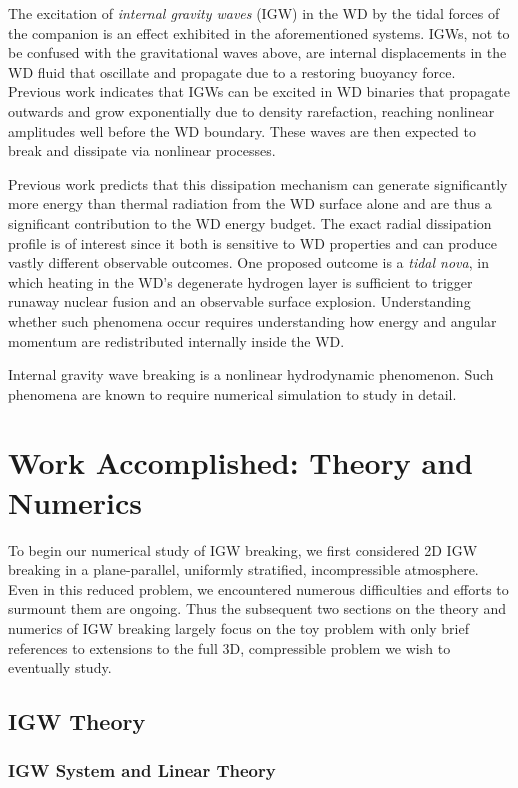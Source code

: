 \documentclass[11pt,
        usenames, %
        dvipsnames %
    ]{article}
\begin{document}
The excitation of \emph{internal gravity waves} (IGW) in the WD by the tidal
forces of the companion is an effect exhibited in the aforementioned systems.
IGWs, not to be confused with the gravitational waves above, are internal
displacements in the WD fluid that oscillate and propagate due to a restoring
buoyancy force. Previous work\citep{fullerI} indicates that IGWs can be excited
in WD binaries that propagate outwards and grow exponentially due to density
rarefaction, reaching nonlinear amplitudes well before the WD boundary. These
waves are then expected to break and dissipate via nonlinear processes.

Previous work predicts that this dissipation mechanism can generate
significantly more energy than thermal radiation from the WD surface alone and
are thus a significant contribution to the WD energy budget\cite{fullerII}. The
exact radial dissipation profile is of interest since it both is sensitive to WD
properties and can produce vastly different observable outcomes. One proposed
outcome is a \emph{tidal nova}, in which heating in the WD's degenerate hydrogen
layer is sufficient to trigger runaway nuclear fusion and an observable surface
explosion\cite{tidal_novae}. Understanding whether such phenomena occur requires
understanding how energy and angular momentum are redistributed internally
inside the WD\@.

Internal gravity wave breaking is a nonlinear hydrodynamic phenomenon. Such
phenomena are known to require numerical simulation to study in detail.

\section{Work Accomplished: Theory and Numerics}

To begin our numerical study of IGW breaking, we first considered 2D IGW
breaking in a plane-parallel, uniformly stratified, incompressible atmosphere.
Even in this reduced problem, we encountered numerous difficulties and efforts
to surmount them are ongoing. Thus the subsequent two sections on the theory and
numerics of IGW breaking largely focus on the toy problem with only brief
references to extensions to the full 3D, compressible problem we wish to
eventually study.

\subsection{IGW Theory}

\subsubsection{IGW System and Linear Theory}
\end{document}
